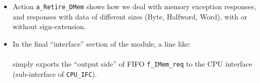 \begin{frame}[fragile]
\begin{center}
\begin{minipage}{0.8\textwidth}
\begin{itemize}
   \item Action {\tt a\_Retire\_DMem} shows how we deal with memory
     exception responses, and responses with data of different sizes
     (Byte, Halfword, Word), with or without sign-extension.

   \vspace*{1ex}

   \item In the final ``interface'' section of the module, a line like: \\
      \\
     simply exports the ``output side'' of FIFO {\tt f\_IMem\_req} to the
     CPU interface (sub-interface of {\tt CPU\_IFC}).
  \end{itemize}

 \end{minipage}
\end{center}

\end{frame}


